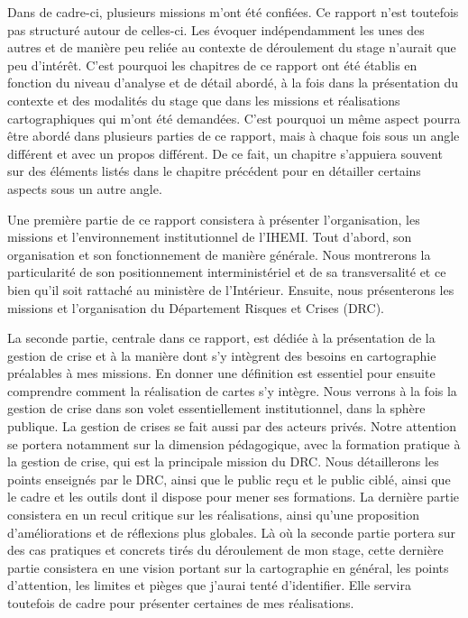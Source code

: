 \documentclass[10pt,a4paper]{report} %
\begin{document}
Dans de cadre-ci, plusieurs missions m’ont été confiées. Ce rapport n’est toutefois pas structuré autour de celles-ci. Les évoquer indépendamment les unes des autres et de manière peu reliée au contexte de déroulement du stage n’aurait que peu d’intérêt. C’est pourquoi les chapitres de ce rapport ont été établis en fonction du niveau d’analyse et de détail abordé, à la fois dans la présentation du contexte et des modalités du stage que dans les missions et réalisations cartographiques qui m’ont été demandées. C’est pourquoi un même aspect pourra être abordé dans plusieurs parties de ce rapport, mais à chaque fois sous un angle différent et avec un propos différent. De ce fait, un chapitre s’appuiera souvent sur des éléments listés dans le chapitre précédent pour en détailler certains aspects sous un autre angle.

 Une première partie de ce rapport consistera à présenter l’organisation, les missions et l’environnement institutionnel de l’IHEMI. Tout d’abord, son organisation et son fonctionnement de manière générale. Nous montrerons la particularité de son positionnement interministériel et de sa transversalité et ce bien qu’il soit rattaché au ministère de l’Intérieur. Ensuite, nous présenterons les missions et l’organisation du Département Risques et Crises (DRC). 

La seconde partie, centrale dans ce rapport, est dédiée à la présentation de la gestion de crise et à la manière dont s’y intègrent des besoins en cartographie préalables à mes missions. En donner une définition est essentiel pour ensuite comprendre comment la réalisation de cartes s’y intègre. Nous verrons à la fois la gestion de crise dans son volet essentiellement institutionnel, dans la sphère publique. La gestion de crises se fait aussi par des acteurs privés. Notre attention se portera notamment sur la dimension pédagogique, avec la formation pratique à la gestion de crise, qui est la principale mission du DRC. Nous détaillerons les points enseignés par le DRC, ainsi que le public reçu et le public ciblé, ainsi que le cadre et les outils dont il dispose pour mener ses formations. La dernière partie consistera en un recul critique sur les réalisations, ainsi qu’une proposition d’améliorations et de réflexions plus globales. Là où la seconde partie portera sur des cas pratiques et concrets tirés du déroulement de mon stage, cette dernière partie consistera en une vision portant sur la cartographie en général, les points d’attention, les limites et pièges que j’aurai tenté d’identifier. Elle servira toutefois de cadre pour présenter certaines de mes réalisations.
\end{document}
